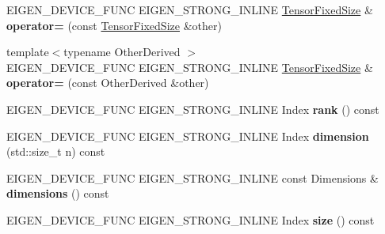 \begin{DoxyCompactItemize}
\item 
\mbox{\label{class_eigen_1_1_tensor_fixed_size_a37f3d41eb9116c5687b39e5d8170ab28}} 
E\+I\+G\+E\+N\+\_\+\+D\+E\+V\+I\+C\+E\+\_\+\+F\+U\+NC E\+I\+G\+E\+N\+\_\+\+S\+T\+R\+O\+N\+G\+\_\+\+I\+N\+L\+I\+NE \hyperlink{class_eigen_1_1_tensor_fixed_size}{Tensor\+Fixed\+Size} \& {\bfseries operator=} (const \hyperlink{class_eigen_1_1_tensor_fixed_size}{Tensor\+Fixed\+Size} \&other)
\item 
\mbox{\label{class_eigen_1_1_tensor_fixed_size_adb1cd1f443a0f3e7f74dad6248df3b30}} 
{\footnotesize template$<$typename Other\+Derived $>$ }\\E\+I\+G\+E\+N\+\_\+\+D\+E\+V\+I\+C\+E\+\_\+\+F\+U\+NC E\+I\+G\+E\+N\+\_\+\+S\+T\+R\+O\+N\+G\+\_\+\+I\+N\+L\+I\+NE \hyperlink{class_eigen_1_1_tensor_fixed_size}{Tensor\+Fixed\+Size} \& {\bfseries operator=} (const Other\+Derived \&other)
\item 
\mbox{\label{class_eigen_1_1_tensor_fixed_size_a9bd827e74e66c5ad8e1139750f932296}} 
E\+I\+G\+E\+N\+\_\+\+D\+E\+V\+I\+C\+E\+\_\+\+F\+U\+NC E\+I\+G\+E\+N\+\_\+\+S\+T\+R\+O\+N\+G\+\_\+\+I\+N\+L\+I\+NE Index {\bfseries rank} () const
\item 
\mbox{\label{class_eigen_1_1_tensor_fixed_size_aa46081bc3fcbd0642d46ec16b2376843}} 
E\+I\+G\+E\+N\+\_\+\+D\+E\+V\+I\+C\+E\+\_\+\+F\+U\+NC E\+I\+G\+E\+N\+\_\+\+S\+T\+R\+O\+N\+G\+\_\+\+I\+N\+L\+I\+NE Index {\bfseries dimension} (std\+::size\+\_\+t n) const
\item 
\mbox{\label{class_eigen_1_1_tensor_fixed_size_a8bdec2696da4981b00f5721e022f37fa}} 
E\+I\+G\+E\+N\+\_\+\+D\+E\+V\+I\+C\+E\+\_\+\+F\+U\+NC E\+I\+G\+E\+N\+\_\+\+S\+T\+R\+O\+N\+G\+\_\+\+I\+N\+L\+I\+NE const Dimensions \& {\bfseries dimensions} () const
\item 
\mbox{\label{class_eigen_1_1_tensor_fixed_size_a96dd0e6a1d15323384f1600b512a9fac}} 
E\+I\+G\+E\+N\+\_\+\+D\+E\+V\+I\+C\+E\+\_\+\+F\+U\+NC E\+I\+G\+E\+N\+\_\+\+S\+T\+R\+O\+N\+G\+\_\+\+I\+N\+L\+I\+NE Index {\bfseries size} () const
\item 
\mbox{\label{class_eigen_1_1_tensor_fixed_size_ae1267be644159b8c4926cc4f62f91a2a}} 

\end{DoxyCompactItemize}
